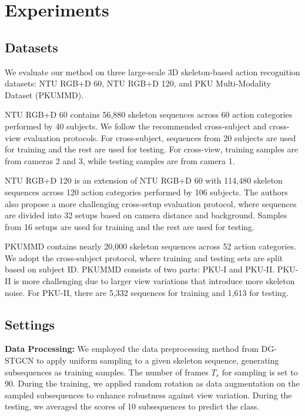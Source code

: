\section{Experiments}
\subsection{Datasets}
We evaluate our method on three large-scale 3D skeleton-based action recognition
datasets: NTU RGB+D 60, NTU RGB+D 120, and PKU Multi-Modality Dataset (PKUMMD).

NTU RGB+D 60 \cite{shahroudy2016ntu} contains 56,880 skeleton sequences across 60
action categories performed by 40 subjects. We follow the recommended cross-subject
and cross-view evaluation protocols. For cross-subject, sequences from 20 subjects
are used for training and the rest are used for testing. For cross-view, training
samples are from cameras 2 and 3, while testing samples are from camera 1. 

NTU RGB+D 120 \cite{liu2019ntu} is an extension of NTU RGB+D 60 with 114,480
skeleton sequences across 120 action categories performed by 106 subjects.
The authors also propose a more challenging cross-setup evaluation protocol, where
sequences are divided into 32 setups based on camera distance and background. Samples
from 16 setups are used for training and the rest are used for testing.

PKUMMD \cite{liu2017pku} contains nearly 20,000 skeleton sequences across 52 action
categories. We adopt the cross-subject protocol, where training and testing sets are
split based on subject ID. PKUMMD consists of two parts: PKU-I and PKU-II. PKU-II is
more challenging due to larger view variations that introduce more skeleton noise.
For PKU-II, there are 5,332 sequences for training and 1,613 for testing.

\subsection{Settings}
\noindent \textbf{Data Processing:}
We employed the data preprocessing method from DG-STGCN \cite{duan2022dg} to apply
uniform sampling to a given skeleton sequence, generating subsequences as training
samples. The number of frames $T_{s}$ for sampling is set to 90.
During the training, we applied random rotation as data augmentation on the
sampled subsequences to enhance robustness against view variation. During the testing,
we averaged the scores of 10 subsequences to predict the class.

